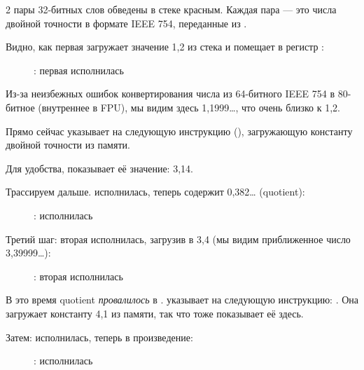 ﻿\clearpage
{}
\myindex{\olly}

2 пары 32-битных слов обведены в стеке красным.
Каждая пара --- это числа двойной точности в формате IEEE 754, переданные из \main.

Видно, как первая \FLD загружает значение 1,2 из стека и помещает в регистр :

\begin{figure}[H]
\centering
{}
\caption{\olly: первая \FLD исполнилась}
\label{fig:FPU_simple_olly_1}
\end{figure}

Из-за неизбежных ошибок конвертирования числа из 64-битного IEEE 754 в 80-битное (внутреннее в FPU),
мы видим здесь 1,1999\ldots, что очень близко к 1,2.

Прямо сейчас \EIP указывает на следующую инструкцию (\FDIV), загружающую константу двойной точности 
из памяти.

Для удобства, \olly показывает её значение: 3,14.

\clearpage
Трассируем дальше. 
\FDIV исполнилась, теперь  содержит 0,382\ldots
(\gls{quotient}):

\begin{figure}[H]
\centering
{}
\caption{\olly: \FDIV исполнилась}
\label{fig:FPU_simple_olly_2}
\end{figure}

\clearpage
Третий шаг: вторая \FLD 
исполнилась, загрузив в  3,4 (мы видим приближенное число 3,39999\ldots): 

\begin{figure}[H]
\centering
{}
\caption{\olly: вторая \FLD исполнилась}
\label{fig:FPU_simple_olly_3}
\end{figure}

В это время \gls{quotient} \emph{провалилось} 
в .
\EIP указывает на следующую инструкцию: \FMUL. 
Она загружает константу 4,1 из памяти, так что \olly тоже показывает её здесь.

\clearpage
Затем: \FMUL исполнилась, теперь в  произведение:

\begin{figure}[H]
\centering
{}
\caption{\olly: \FMUL исполнилась}
\label{fig:FPU_simple_olly_4}
\end{figure}

